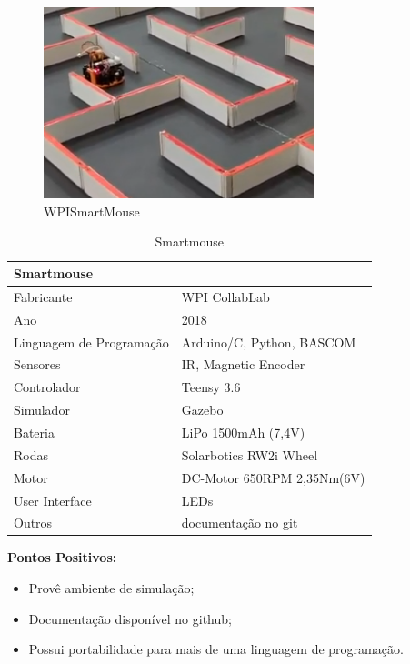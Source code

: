 \begin{figure}[H]
	\centering
	\includegraphics[width=0.7\textwidth]
	{Figures/WPISmartMouse_model.png}
	\caption{\label{fig:WPISmartMouse_model} WPISmartMouse}
\end{figure}

\begin{table}[H]
	\centering
	\begin{tabular}{|l|l|}
		\hline
		\multicolumn{2}{|l|}{\textbf{Smartmouse}} \\ \hline
		Fabricante & WPI CollabLab \\ \hline
		Ano & 2018 \\ \hline
		Linguagem de Programação & Arduino/C, Python, BASCOM \\ \hline
		Sensores & IR, Magnetic Encoder \\ \hline
		Controlador & Teensy 3.6 \\ \hline
		Simulador & Gazebo \\ \hline
		Bateria & LiPo 1500mAh (7,4V) \\ \hline
		Rodas & Solarbotics RW2i Wheel \\ \hline
		Motor & DC-Motor 650RPM 2,35Nm(6V) \\ \hline
		User Interface & LEDs \\ \hline
		Outros & documentação no git \\ \hline
	\end{tabular}
	\caption{{\label{tab:Smartmouse}Smartmouse}}
\end{table}

\textbf{Pontos Positivos:}
\begin{itemize}
	\item Provê ambiente de simulação;
	\item Documentação disponível no github;
	\item Possui portabilidade para mais de uma linguagem de programação.
\end{itemize}

